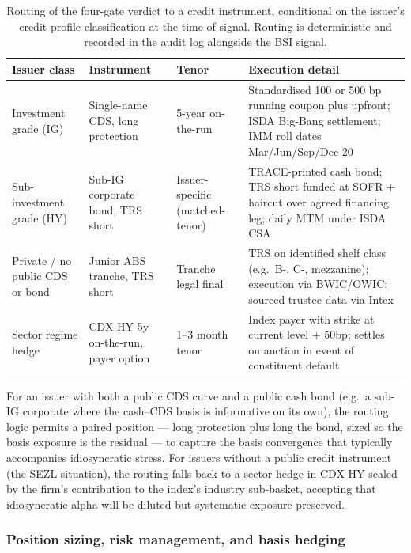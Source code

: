 \documentclass[11pt,a4paper]{article}
\begin{document}
\begin{table}[h]
\centering\small
\begin{tabular}{@{}p{2.7cm}p{3.5cm}p{2.4cm}p{4.6cm}@{}}
\toprule
\textbf{Issuer class} & \textbf{Instrument} & \textbf{Tenor} & \textbf{Execution detail} \\
\midrule
Investment grade (IG) & Single-name CDS, long protection & 5-year on-the-run & Standardised 100 or 500 bp running coupon plus upfront; ISDA Big-Bang settlement; IMM roll dates Mar/Jun/Sep/Dec 20 \\
Sub-investment grade (HY) & Sub-IG corporate bond, TRS short & Issuer-specific (matched-tenor) & TRACE-printed cash bond; TRS short funded at SOFR + haircut over agreed financing leg; daily MTM under ISDA CSA \\
Private / no public CDS or bond & Junior ABS tranche, TRS short & Tranche legal final & TRS on identified shelf class (e.g.\ B-, C-, mezzanine); execution via BWIC/OWIC; sourced trustee data via Intex \\
Sector regime hedge & CDX HY 5y on-the-run, payer option & 1--3 month tenor & Index payer with strike at current level + 50bp; settles on auction in event of constituent default \\
\bottomrule
\end{tabular}
\caption{Routing of the four-gate verdict to a credit instrument, conditional on the issuer's credit profile classification at the time of signal. Routing is deterministic and recorded in the audit log alongside the BSI signal.}\label{tab:fi_routing}
\end{table}

For an issuer with both a public CDS curve and a public cash bond (e.g.\ a sub-IG corporate where the cash--CDS basis is informative on its own), the routing logic permits a paired position --- long protection plus long the bond, sized so the basis exposure is the residual --- to capture the basis convergence that typically accompanies idiosyncratic stress. For issuers without a public credit instrument (the SEZL situation), the routing falls back to a sector hedge in CDX HY scaled by the firm's contribution to the index's industry sub-basket, accepting that idiosyncratic alpha will be diluted but systematic exposure preserved.

\subsubsection{Position sizing, risk management, and basis hedging}
\end{document}
